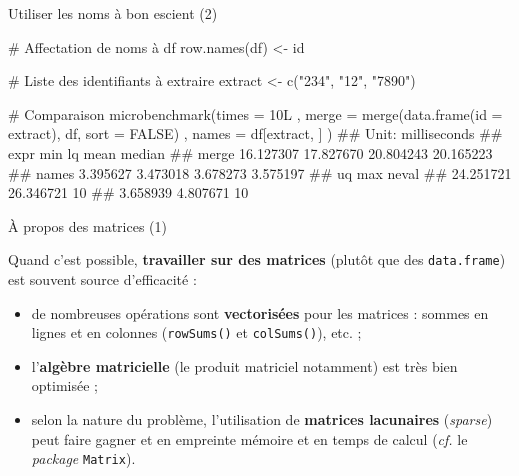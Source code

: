 \documentclass[12pt,handout,ignorenonframetext,]{beamer}
\newenvironment{Shaded}{}{}
\newcommand{\KeywordTok}[1]{\textcolor[rgb]{0.00,0.00,1.00}{#1}}
\newcommand{\DataTypeTok}[1]{#1}
\newcommand{\StringTok}[1]{\textcolor[rgb]{0.00,0.50,0.50}{#1}}
\newcommand{\CommentTok}[1]{\textcolor[rgb]{0.00,0.50,0.00}{#1}}
\newcommand{\OtherTok}[1]{\textcolor[rgb]{1.00,0.25,0.00}{#1}}
\newcommand{\NormalTok}[1]{#1}
\providecommand{\tightlist}{%
  \setlength{\itemsep}{0pt}\setlength{\parskip}{0pt}}
\renewenvironment{Shaded}{\begin{snugshade}}{\end{snugshade}}
\begin{document}
\begin{frame}[fragile]{Utiliser les noms à bon escient (2)}

\footnotesize

\begin{Shaded}
\begin{Highlighting}[]
\CommentTok{# Affectation de noms à df }
\KeywordTok{row.names}\NormalTok{(df) <-}\StringTok{ }\NormalTok{id}

\CommentTok{# Liste des identifiants à extraire}
\NormalTok{extract <-}\StringTok{ }\KeywordTok{c}\NormalTok{(}\StringTok{"234"}\NormalTok{, }\StringTok{"12"}\NormalTok{, }\StringTok{"7890"}\NormalTok{)}

\CommentTok{# Comparaison}
\KeywordTok{microbenchmark}\NormalTok{(}\DataTypeTok{times =}\NormalTok{ 10L}
\NormalTok{  , }\DataTypeTok{merge =} \KeywordTok{merge}\NormalTok{(}\KeywordTok{data.frame}\NormalTok{(}\DataTypeTok{id =}\NormalTok{ extract), df, }\DataTypeTok{sort =} \OtherTok{FALSE}\NormalTok{)}
\NormalTok{  , }\DataTypeTok{names =}\NormalTok{ df[extract, ]}
\NormalTok{)}
\NormalTok{  ## Unit: milliseconds}
\NormalTok{  ##   expr       min        lq      mean    median}
\NormalTok{  ##  merge 16.127307 17.827670 20.804243 20.165223}
\NormalTok{  ##  names  3.395627  3.473018  3.678273  3.575197}
\NormalTok{  ##         uq       max neval}
\NormalTok{  ##  24.251721 26.346721    10}
\NormalTok{  ##   3.658939  4.807671    10}
\end{Highlighting}
\end{Shaded}

\end{frame}

\begin{frame}[fragile]{À propos des matrices (1)}

Quand c'est possible, \textbf{travailler sur des matrices} (plutôt que
des \texttt{data.frame}) est souvent source d'efficacité :

\vfill

\begin{itemize}
\tightlist
\item
  \pause de nombreuses opérations sont \textbf{vectorisées} pour les
  matrices : sommes en lignes et en colonnes (\texttt{rowSums()} et
  \texttt{colSums()}), etc. ;
\end{itemize}

\vfill 

\begin{itemize}
\tightlist
\item
  \pause l'\textbf{algèbre matricielle} (le produit matriciel notamment)
  est très bien optimisée ;
\end{itemize}

\vfill

\begin{itemize}
\tightlist
\item
  \pause selon la nature du problème, l'utilisation de \textbf{matrices
  lacunaires} (\emph{sparse}) peut faire gagner et en empreinte mémoire
  et en temps de calcul (\emph{cf.} le \emph{package} \texttt{Matrix}).
\end{itemize}

\end{frame}
\end{document}
